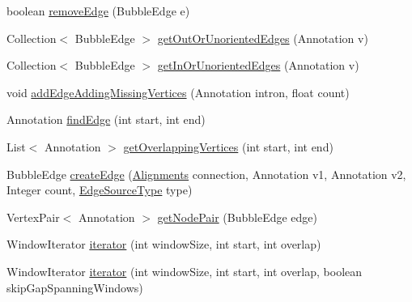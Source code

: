 \begin{DoxyCompactItemize}
\item 
boolean \hyperlink{classbroad_1_1pda_1_1seq_1_1graph_1_1_chromosome_with_bubbles_j_graph_t_a1177f3eca6d4636e1e418e6ff41af7a3}{remove\+Edge} (Bubble\+Edge e)
\item 
Collection$<$ Bubble\+Edge $>$ \hyperlink{classbroad_1_1pda_1_1seq_1_1graph_1_1_chromosome_with_bubbles_j_graph_t_aceaf71f4821bdafa6bd63423762ef9fc}{get\+Out\+Or\+Unoriented\+Edges} (Annotation v)
\item 
Collection$<$ Bubble\+Edge $>$ \hyperlink{classbroad_1_1pda_1_1seq_1_1graph_1_1_chromosome_with_bubbles_j_graph_t_ac11519a79446df006a85aa51487d9171}{get\+In\+Or\+Unoriented\+Edges} (Annotation v)
\item 
void \hyperlink{classbroad_1_1pda_1_1seq_1_1graph_1_1_chromosome_with_bubbles_j_graph_t_acefbfff6a2a745f7cf420f8d4c5a0e15}{add\+Edge\+Adding\+Missing\+Vertices} (Annotation intron, float count)
\item 
Annotation \hyperlink{classbroad_1_1pda_1_1seq_1_1graph_1_1_chromosome_with_bubbles_j_graph_t_adde361815cc1da20749f47b5074e7101}{find\+Edge} (int start, int end)
\item 
List$<$ Annotation $>$ \hyperlink{classbroad_1_1pda_1_1seq_1_1graph_1_1_chromosome_with_bubbles_j_graph_t_aeeeb5f64b18f9125c5dcb3b392dbfb7c}{get\+Overlapping\+Vertices} (int start, int end)
\item 
Bubble\+Edge \hyperlink{classbroad_1_1pda_1_1seq_1_1graph_1_1_chromosome_with_bubbles_j_graph_t_aa00423c00a6b114c4b1146278a8ec66d}{create\+Edge} (\hyperlink{classbroad_1_1pda_1_1datastructures_1_1_alignments}{Alignments} connection, Annotation v1, Annotation v2, Integer count, \hyperlink{enumbroad_1_1pda_1_1seq_1_1graph_1_1_chromosome_with_bubbles_j_graph_t_1_1_edge_source_type}{Edge\+Source\+Type} type)
\item 
Vertex\+Pair$<$ Annotation $>$ \hyperlink{classbroad_1_1pda_1_1seq_1_1graph_1_1_chromosome_with_bubbles_j_graph_t_a94688ea637f3ddea7183104a100f3d60}{get\+Node\+Pair} (Bubble\+Edge edge)
\item 
Window\+Iterator \hyperlink{classbroad_1_1pda_1_1seq_1_1graph_1_1_chromosome_with_bubbles_j_graph_t_a35b4ae76c25f67ebad6f30d8f0457e59}{iterator} (int window\+Size, int start, int overlap)
\item 
Window\+Iterator \hyperlink{classbroad_1_1pda_1_1seq_1_1graph_1_1_chromosome_with_bubbles_j_graph_t_a8cfa2b58cf5ca0466c67439292d04442}{iterator} (int window\+Size, int start, int overlap, boolean skip\+Gap\+Spanning\+Windows)
\item 

\end{DoxyCompactItemize}

